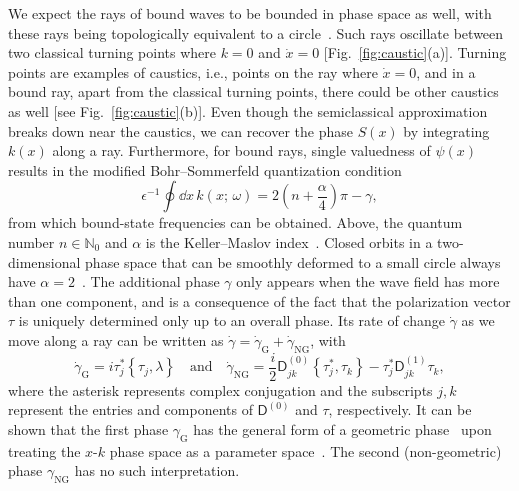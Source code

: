 We expect the rays of bound waves to be bounded in phase space as well, with these rays being topologically equivalent to a circle~\cite{keller1958,mcdonald1988}.
Such rays oscillate between two classical turning points where $k = 0$ and $\dot{x} = 0$ [Fig.~\ref{fig:caustic}(a)].
Turning points are examples of caustics, i.e., points on the ray where $\dot{x} = 0$, and in a bound ray, apart from the classical turning points, there could be other caustics as well [see Fig.~\ref{fig:caustic}(b)].
Even though the semiclassical approximation breaks down near the caustics, we can recover the phase $S(x)$ by integrating $k(x)$ along a ray.
Furthermore, for bound rays, single valuedness of $\psi(x)$ results in the modified Bohr--Sommerfeld quantization condition
%
\begin{equation}
  \epsilon^{-1}\oint \dd{x}\,k(x;\, \omega) = 2\left(n + \frac{\alpha}{4}\right)\pi - \gamma,
  \label{eq:quantization}
\end{equation}
%
from which bound-state frequencies can be obtained.
Above, the quantum number $n \in \mathbb{N}_{0}$ and $\alpha$ is the Keller--Maslov index~\cite{keller1958,maslov1981}.
Closed orbits in a two-dimensional phase space that can be smoothly deformed to a small circle always have $\alpha = 2$~\cite{percival1977}.
The additional phase $\gamma$ only appears when the wave field has more than one component, and is a consequence of the fact that the polarization vector $\tau$ is uniquely determined only up to an overall phase.
Its rate of change $\dot{\gamma}$ as we move along a ray can be written as $\dot{\gamma} = \dot{\gamma}_{\text{G}} + \dot{\gamma}_{\text{NG}}$, with~\cite{yabana1986,kaufman1987,venaille2023}
%
\begin{equation}
\dot{\gamma}_{\text{G}} = i\tau_{j}^{*}\left\{\tau_{j}, \lambda\right\} %
  \quad\text{and}\quad
  \dot{\gamma}_{\text{NG}} = \frac{i}{2}\mathsf{D}^{(0)}_{jk}\left\{\tau^{*}_{j}, \tau_{k}\right\} - \tau_{j}^{*}\mathsf{D}^{(1)}_{jk}\tau_{k},
\label{eq:extra_phases}
\end{equation}
%
where the asterisk represents complex conjugation and the subscripts $j, k$ represent the entries and components of $\mathsf{D}^{(0)}$ and $\tau$, respectively.
It can be shown that the first phase $\gamma_{\text{G}}$ has the general form of a geometric phase~\cite{pancharatnam1956,berry1984} upon treating the $x$-$k$ phase space as a parameter space~\cite{yabana1986}.
The second (non-geometric) phase $\gamma_{\text{NG}}$ has no such interpretation.

